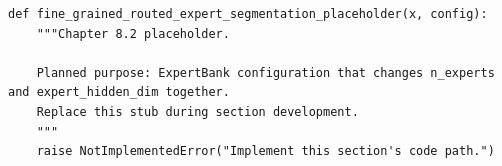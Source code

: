 \begin{lstlisting}[style=bookpython,caption={Planned code placeholder for fine grained routed expert segmentation.},label={lst:ch08-fine-grained-routed-expert-segmentation}]
def fine_grained_routed_expert_segmentation_placeholder(x, config):
    """Chapter 8.2 placeholder.

    Planned purpose: ExpertBank configuration that changes n_experts and expert_hidden_dim together.
    Replace this stub during section development.
    """
    raise NotImplementedError("Implement this section's code path.")
\end{lstlisting}

